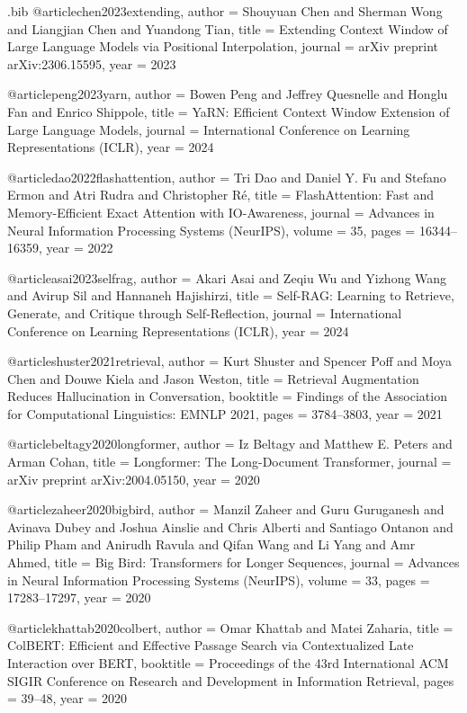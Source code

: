 \begin{filecontents*}{\jobname.bib}
@article{chen2023extending,
  author    = {Shouyuan Chen and Sherman Wong and Liangjian Chen and Yuandong Tian},
  title     = {Extending Context Window of Large Language Models via Positional Interpolation},
  journal   = {arXiv preprint arXiv:2306.15595},
  year      = {2023}
}

@article{peng2023yarn,
  author    = {Bowen Peng and Jeffrey Quesnelle and Honglu Fan and Enrico Shippole},
  title     = {YaRN: Efficient Context Window Extension of Large Language Models},
  journal   = {International Conference on Learning Representations (ICLR)},
  year      = {2024}
}

@article{dao2022flashattention,
  author    = {Tri Dao and Daniel Y. Fu and Stefano Ermon and Atri Rudra and Christopher R{\'{e}}},
  title     = {FlashAttention: Fast and Memory-Efficient Exact Attention with {IO}-Awareness},
  journal   = {Advances in Neural Information Processing Systems (NeurIPS)},
  volume    = {35},
  pages     = {16344--16359},
  year      = {2022}
}

@article{asai2023selfrag,
  author    = {Akari Asai and Zeqiu Wu and Yizhong Wang and Avirup Sil and Hannaneh Hajishirzi},
  title     = {Self-RAG: Learning to Retrieve, Generate, and Critique through Self-Reflection},
  journal   = {International Conference on Learning Representations (ICLR)},
  year      = {2024}
}

@article{shuster2021retrieval,
  author    = {Kurt Shuster and Spencer Poff and Moya Chen and Douwe Kiela and Jason Weston},
  title     = {Retrieval Augmentation Reduces Hallucination in Conversation},
  booktitle = {Findings of the Association for Computational Linguistics: EMNLP 2021},
  pages     = {3784--3803},
  year      = {2021}
}

@article{beltagy2020longformer,
  author    = {Iz Beltagy and Matthew E. Peters and Arman Cohan},
  title     = {Longformer: The Long-Document Transformer},
  journal   = {arXiv preprint arXiv:2004.05150},
  year      = {2020}
}

@article{zaheer2020bigbird,
  author    = {Manzil Zaheer and Guru Guruganesh and Avinava Dubey and Joshua Ainslie and Chris Alberti and Santiago Ontanon and Philip Pham and Anirudh Ravula and Qifan Wang and Li Yang and Amr Ahmed},
  title     = {Big Bird: Transformers for Longer Sequences},
  journal   = {Advances in Neural Information Processing Systems (NeurIPS)},
  volume    = {33},
  pages     = {17283--17297},
  year      = {2020}
}

@article{khattab2020colbert,
  author    = {Omar Khattab and Matei Zaharia},
  title     = {ColBERT: Efficient and Effective Passage Search via Contextualized Late Interaction over {BERT}},
  booktitle = {Proceedings of the 43rd International ACM SIGIR Conference on Research and Development in Information Retrieval},
  pages     = {39--48},
  year      = {2020}
}


\end{filecontents*}
